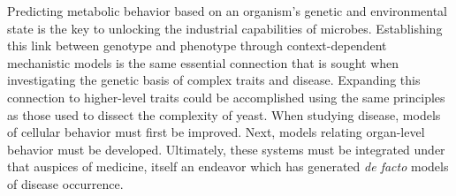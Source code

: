 Predicting metabolic behavior based on an organism's genetic and environmental state is the key to unlocking the industrial capabilities of microbes. Establishing this link between genotype and phenotype through context-dependent mechanistic models is the same essential connection that is sought when investigating the genetic basis of complex traits and disease. Expanding this connection to higher-level traits could be accomplished using the same principles as those used to dissect the complexity of yeast. When studying disease, models of cellular behavior must first be improved. Next, models relating organ-level behavior must be developed. Ultimately, these systems must be integrated under that auspices of medicine, itself an endeavor which has generated \textit{de facto} models of disease occurrence. 
